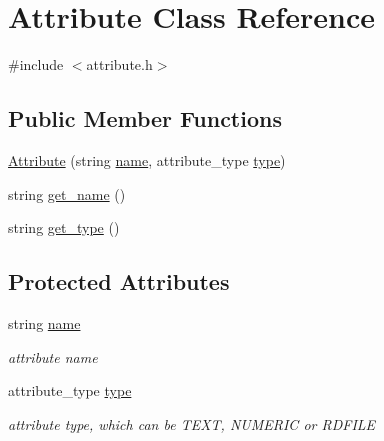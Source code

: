 \hypertarget{classAttribute}{}\section{Attribute Class Reference}
\label{classAttribute}


{\ttfamily \#include $<$attribute.\+h$>$}

\subsection*{Public Member Functions}
\begin{DoxyCompactItemize}
\item 
\hyperlink{classAttribute_af984b2d6d550fbfd05ebae632f1c2aac}{Attribute} (string \hyperlink{classAttribute_a0ae8aecc89393eb4f414f7053cf81a7b}{name}, attribute\+\_\+type \hyperlink{classAttribute_ae0d72c235f5ab58a4618ecfbe3ae5773}{type})
\item 
string \hyperlink{classAttribute_a4a2e75358b3e66e08ad0b798ceb19e8f}{get\+\_\+name} ()
\item 
string \hyperlink{classAttribute_a62f47a1d31095cfe3be2903ed89aaf00}{get\+\_\+type} ()
\end{DoxyCompactItemize}
\subsection*{Protected Attributes}
\begin{DoxyCompactItemize}
\item 
\mbox{\label{classAttribute_a0ae8aecc89393eb4f414f7053cf81a7b}} 
string \hyperlink{classAttribute_a0ae8aecc89393eb4f414f7053cf81a7b}{name}
\begin{DoxyCompactList}\small\item\em attribute name \end{DoxyCompactList}\item 
\mbox{\label{classAttribute_ae0d72c235f5ab58a4618ecfbe3ae5773}} 
attribute\+\_\+type \hyperlink{classAttribute_ae0d72c235f5ab58a4618ecfbe3ae5773}{type}
\begin{DoxyCompactList}\small\item\em attribute type, which can be T\+E\+XT, N\+U\+M\+E\+R\+IC or R\+D\+F\+I\+LE \end{DoxyCompactList}\end{DoxyCompactItemize}



